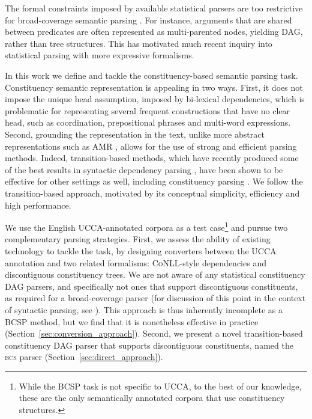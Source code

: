 \documentclass[11pt]{article}
\newcommand{\secref}[1]{Section~\ref{#1}}
\begin{document}

The formal constraints imposed by available statistical parsers are
too restrictive for broad-coverage semantic parsing \cite{oepen2015semeval}.
For instance, arguments that are
shared between predicates are often represented as multi-parented nodes,
yielding DAG, rather than tree structures. This has motivated much recent
inquiry into statistical parsing with more expressive formalisms.

In this work we define and tackle the constituency-based semantic parsing task.
Constituency semantic representation is appealing in two ways.
First, it does not impose the unique head assumption, imposed
by bi-lexical dependencies, which is problematic for representing several
frequent constructions that have no clear
head, such as coordination, prepositional phrases and multi-word expressions.
Second, grounding the representation in the text, unlike more abstract representations
such as AMR \cite{banarescu2013abstract},
allows for the use of strong and efficient parsing methods.
Indeed, transition-based methods, which have recently produced some of the best
results in syntactic dependency
parsing \cite{dyer2015transition,ballesteros2015improved},
have been shown to be effective for other settings as well,
including constituency parsing \cite{sagae2005classifier,zhu2013fast,maier2015discontinuous}. 
We follow the transition-based approach, motivated by
its conceptual simplicity, efficiency and high performance.

We use the English UCCA-annotated corpora \cite{abend2013universal} as a test
case\footnote{While the BCSP task is not specific to UCCA,
  to the best of our knowledge, these are the only
  semantically annotated corpora that use constituency structures.}
and pursue two complementary parsing strategies.
First, we assess the ability of existing technology to tackle the task,
by designing converters between the UCCA annotation and two related formalisms:
\textsc{CoNLL}-style dependencies and discontiguous constituency trees.
We are not aware of any statistical constituency DAG parsers, and specifically not
ones that support discontiguous constituents, as required for a broad-coverage
parser (for discussion of this point in the context of syntactic parsing, see
\cite{kallmeyer2013data,pitler2015linear}).
This approach is thus inherently incomplete as a BCSP method, but we find that it is
nonetheless effective in practice (\secref{sec:conversion_approach}).
Second, we present a novel transition-based
constituency DAG parser that supports discontiguous constituents, named
the \textsc{bcs} parser (\secref{sec:direct_approach}).
\end{document}
